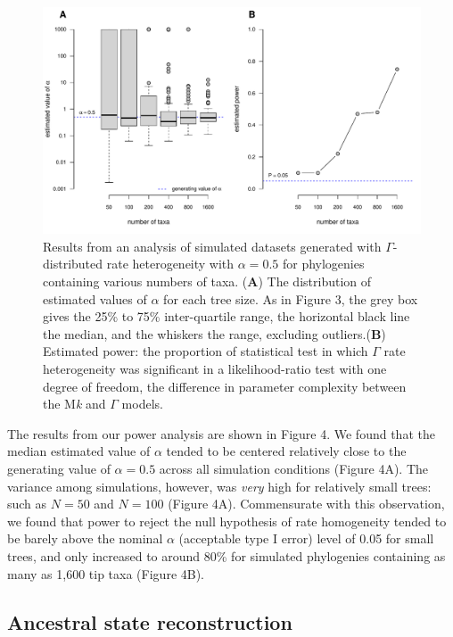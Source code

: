 \documentclass[fleqn,10pt,lineno]{wlpeerj} %
\begin{document}
\begin{figure}
\includegraphics[width=1\linewidth]{Revell-and-Harmon.fitgammaMk.PeerJ_files/figure-latex/Revell-and-Harmon-fig4-1} \caption{Results from an analysis of simulated datasets generated with $\Gamma$-distributed rate heterogeneity with $\alpha = 0.5$ for phylogenies containing various numbers of taxa. (\textbf{A}) The distribution of estimated values of $\alpha$ for each tree size. As in Figure 3, the grey box gives the 25\% to 75\% inter-quartile range, the horizontal black line the median, and the whiskers the range, excluding outliers.(\textbf{B}) Estimated power: the proportion of statistical test in which $\Gamma$ rate heterogeneity was significant in a likelihood-ratio test with one degree of freedom, the difference in parameter complexity between the M\emph{k} and $\Gamma$ models.}\label{fig:Revell-and-Harmon-fig4}
\end{figure}

The results from our power analysis are shown in Figure 4. We found that the median estimated value of \(\alpha\) tended to be centered relatively close to the generating value of \(\alpha = 0.5\) across all simulation conditions (Figure 4A). The variance among simulations, however, was \emph{very} high for relatively small trees: such as \(N = 50\) and \(N = 100\) (Figure 4A). Commensurate with this observation, we found that power to reject the null hypothesis of rate homogeneity tended to be barely above the nominal \(\alpha\) (acceptable type I error) level of 0.05 for small trees, and only increased to around 80\% for simulated phylogenies containing as many as 1,600 tip taxa (Figure 4B).

\subsection{Ancestral state reconstruction}\label{ancestral-state-reconstruction}
\end{document}

